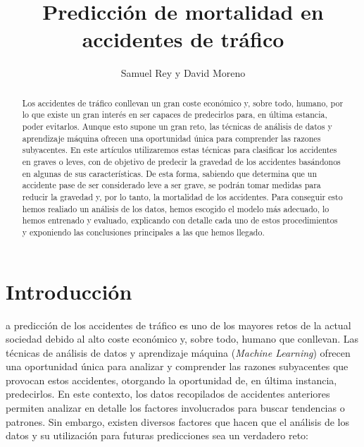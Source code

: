 \documentclass[journal,twoside]{JoPhA}
\begin{document}
\title{Predicción de mortalidad en accidentes de tráfico}
 
\author{Samuel Rey y David Moreno
}


\maketitle


\begin{abstract}
Los accidentes de tráfico conllevan un gran coste económico y, sobre todo, humano, por lo que existe un gran interés en ser capaces de predecirlos para, en última estancia, poder evitarlos. Aunque esto supone un gran reto, las técnicas de análisis de datos y aprendizaje máquina ofrecen una oportunidad única para comprender las razones subyacentes. En este artículos utilizaremos estas técnicas para clasificar los accidentes en graves o leves, con de objetivo de predecir la gravedad de los accidentes basándonos en algunas de sus características. De esta forma, sabiendo que determina que un accidente pase de ser considerado leve a ser grave, se podrán tomar medidas para reducir la gravedad y, por lo tanto, la mortalidad de los accidentes. Para conseguir esto hemos realiado un análisis de los datos, hemos escogido el modelo más adecuado, lo hemos entrenado y evaluado, explicando con detalle cada uno de estos procedimientos y exponiendo las conclusiones principales a las que hemos llegado.
\end{abstract}


\section{Introducción}
a predicción de los accidentes de tráfico es uno de los mayores retos de la actual sociedad debido al alto coste económico y, sobre todo, humano que conllevan. Las técnicas de análisis de datos y aprendizaje máquina (\textit{Machine Learning}) ofrecen una oportunidad única para analizar y comprender las razones subyacentes que provocan estos accidentes, otorgando la oportunidad de, en última instancia, predecirlos. En este contexto, los datos recopilados de accidentes anteriores permiten analizar en detalle los factores involucrados para buscar tendencias o patrones. Sin embargo, existen diversos factores que hacen que el análisis de los datos y su utilización para futuras predicciones sea un verdadero reto: \\
\end{document}
